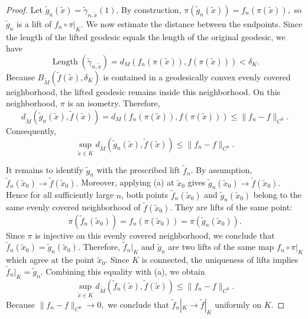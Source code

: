 \documentclass[10pt,a4paper]{amsart}
\begin{document}
\begin{proof}
		Let $\widetilde g_n(\tilde x) = \widetilde\gamma_{n,\tilde x}(1).$ By
		construction, $\pi(\widetilde g_n(\tilde x)) = f_n(\pi(\tilde x)),$ so
		$\widetilde g_n$ is a lift of $f_n\circ\pi|_K.$ We now estimate the distance
		between the endpoints. Since the length of the lifted geodesic equals the length
		of the original geodesic, we have
		\[
		\operatorname{Length} (\widetilde\gamma_{n,\tilde x}) =
		d_M(f_n(\pi(\tilde x)),f(\pi(\tilde x))) < \delta_K.
		\]
		Because $B_{\widetilde M}(\widetilde f(\tilde x),\delta_K)$ is contained in a
		geodesically convex evenly covered neighborhood, the lifted geodesic remains
		inside this neighborhood. On this neighborhood, $\pi$ is an isometry. Therefore,
		\[
		d_{\widetilde M} (\widetilde g_n(\tilde x),\widetilde f(\tilde x)) =
		d_M(f_n(\pi(\tilde x)),f(\pi(\tilde x))) \le \|f_n-f\|_{C^0}.
		\]
		Consequently,
		\[
		\sup_{\tilde x\in K} d_{\widetilde M} (\widetilde g_n(\tilde x),\widetilde
		f(\tilde x)) \le \|f_n-f\|_{C^0}.
		\tag{a}
		\]
		
		It remains to identify $\widetilde g_n$ with the prescribed lift $\widetilde
		f_n$. By assumption, $\widetilde f_n(\tilde x_0) \longrightarrow \widetilde
		f(\tilde x_0).$ Moreover, applying (a) at $\tilde x_0$ gives $\widetilde
		g_n(\tilde x_0) \longrightarrow \widetilde f(\tilde x_0).$ Hence for all
		sufficiently large $n$, both points $\widetilde f_n(\tilde x_0)$ and
		$\widetilde g_n(\tilde x_0)$ belong to the same evenly covered neighborhood of
		$\widetilde f(\tilde x_0)$. They are lifts of the same point:
		\[
		\pi(\widetilde f_n(\tilde x_0)) = f_n(\pi(\tilde x_0)) =
		\pi(\widetilde g_n(\tilde x_0)).
		\]
		Since $\pi$ is injective on this evenly covered neighborhood, we conclude that
		$\widetilde f_n(\tilde x_0) = \widetilde g_n(\tilde x_0).$ Therefore,
		$\widetilde f_n|_K$ and $\widetilde g_n$ are two lifts of the same map
		$f_n\circ\pi|_K$ which agree at the point $\tilde x_0$. Since $K$ is connected,
		the uniqueness of lifts implies $\widetilde f_n|_K = \widetilde g_n.$ Combining
		this equality with (a), we obtain
		\[
		\sup_{\tilde x\in K} d_{\widetilde M} (\widetilde f_n(\tilde x),\widetilde
		f(\tilde x)) \le \|f_n-f\|_{C^0}.
		\]
		Because $\|f_n-f\|_{C^0}\longrightarrow0,$ we conclude that $\widetilde f_n|_K
		\longrightarrow \widetilde f|_K$ uniformly on $K$.
	\end{proof}
\end{document}
